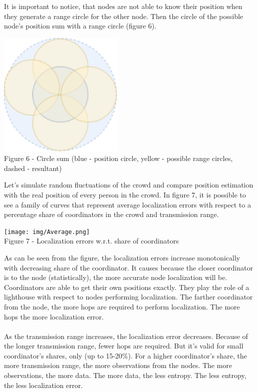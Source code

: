 \documentclass[12pt,a4paper]{report}
\begin{document}
It is important to notice, that nodes are not able to know their position when they generate a range circle for the other node. Then the circle of the possible node's position sum with a range circle (figure 6).
\begin{center}
    \includegraphics[width=6cm]{img/sum.png}\\
    Figure 6 - Circle sum (blue - position circle, yellow - possible range circles, dashed - resultant)
\end{center}
Let's simulate random fluctuations of the crowd and compare position estimation with the real position of every person in the crowd. In figure 7, it is possible to see a family of curves that represent average localization errors with respect to a percentage share of coordinators in the crowd and transmission range.
\begin{center}
    \texttt{[image: img/Average.png]}\\
    Figure 7 - Localization errors w.r.t. share of coordinators
\end{center}
As can be seen from the figure, the localization errors increase monotonically with decreasing share of the coordinator. It causes because the closer coordinator is to the node (statistically), the more accurate node localization will be. Coordinators are able to get their own positions exactly. They play the role of a lighthouse with respect to nodes performing localization. The farther coordinator from the node, the more hops are required to perform localization. The more hops the more localization error. \\\\
As the transmission range increases, the localization error decreases. Because of the longer transmission range, fewer hops are required. But it's valid for small coordinator's shares, only (up to 15-20\%). For a higher coordinator's share, the more transmission range, the more observations from the nodes. The more observations, the more data. The more data, the less entropy. The less entropy, the less localization error.\\\\
\end{document}

